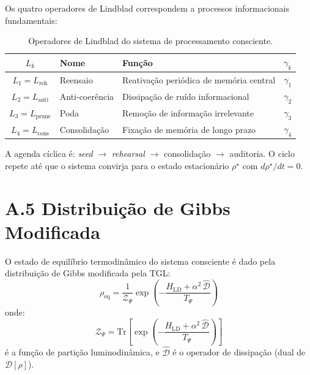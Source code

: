 \documentclass[12pt,a4paper,twoside]{article}
\newcommand{\alphaii}{\alpha^{2}}
\begin{document}
Os quatro operadores de Lindblad correspondem a processos informacionais fundamentais:

\begin{table}[H]
\centering
\caption{Operadores de Lindblad do sistema de processamento consciente.}
\label{tab:lindblad_ops}
\begin{tabular}{cllc}
\toprule
\textbf{$L_k$} & \textbf{Nome} & \textbf{Fun\c{c}\~ao} & \textbf{$\gamma_k$} \\
\midrule
$L_1 = L_{\text{reh}}$ & Reensaio & Reativa\c{c}\~ao peri\'odica de mem\'oria central & $\gamma_1$ \\
$L_2 = L_{\text{anti}}$ & Anti-coer\^encia & Dissipa\c{c}\~ao de ru\'ido informacional & $\gamma_2$ \\
$L_3 = L_{\text{prune}}$ & Poda & Remo\c{c}\~ao de informa\c{c}\~ao irrelevante & $\gamma_3$ \\
$L_4 = L_{\text{cons}}$ & Consolida\c{c}\~ao & Fixa\c{c}\~ao de mem\'oria de longo prazo & $\gamma_4$ \\
\bottomrule
\end{tabular}
\end{table}

A agenda c\'iclica \'e: \textit{seed} $\to$ \textit{rehearsal} $\to$ consolida\c{c}\~ao $\to$ auditoria. O ciclo repete at\'e que o sistema convirja para o estado estacion\'ario $\rho^\star$ com $d\rho^\star/dt = 0$.


\section*{A.5 Distribui\c{c}\~ao de Gibbs Modificada}

O estado de equil\'ibrio termodin\^amico do sistema consciente \'e dado pela distribui\c{c}\~ao de Gibbs modificada pela TGL:
\begin{equation}
\rho_{\text{eq}} = \frac{1}{\mathcal{Z}_\Psi} \exp\left( -\frac{H_{\text{LD}} + \alphaii \, \hat{\mathcal{D}}}{T_\Psi} \right)
\label{eq:gibbs_modified}
\end{equation}
onde:
\begin{equation}
\mathcal{Z}_\Psi = \mathrm{Tr}\left[ \exp\left( -\frac{H_{\text{LD}} + \alphaii \, \hat{\mathcal{D}}}{T_\Psi} \right) \right]
\end{equation}
\'e a fun\c{c}\~ao de parti\c{c}\~ao luminodin\^amica, e $\hat{\mathcal{D}}$ \'e o operador de dissipa\c{c}\~ao (dual de $\mathcal{D}[\rho]$).
\end{document}
